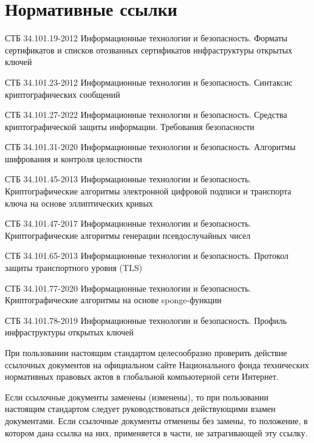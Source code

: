 \chapter{Нормативные ссылки}\label{Refs}


СТБ 34.101.19-2012 Информационные технологии и безопасность. Форматы
сертификатов и списков отозванных сертификатов инфраструктуры открытых ключей

СТБ 34.101.23-2012 Информационные технологии и безопасность. Синтаксис
криптографических сообщений

СТБ 34.101.27-2022 Информационные технологии и безопасность. Средства
криптографической защиты информации. Требования безопасности

СТБ 34.101.31-2020 Информационные технологии и безопасность. Алгоритмы 
шифрования и контроля целостности  

СТБ 34.101.45-2013 Информационные технологии и безопасность. Криптографические
алгоритмы электронной цифровой подписи и транспорта ключа на основе
эллиптических кривых

СТБ 34.101.47-2017 Информационные технологии и безопасность. Криптографические
алгоритмы генерации псевдослучайных чисел

СТБ 34.101.65-2013 Информационные технологии и безопасность. Протокол защиты
транспортного уровня (TLS)


СТБ 34.101.77-2020 Информационные технологии и безопасность. Криптографические
алгоритмы на основе sponge-функции

СТБ 34.101.78-2019 Информационные технологии и безопасность. Профиль
инфраструктуры открытых ключей


\begin{note*}
При пользовании настоящим стандартом целесообразно проверить действие
ссылочных документов на официальном сайте Национального фонда
технических нормативных правовых актов в глобальной компьютерной сети Интернет.

Если ссылочные документы заменены (изменены), то при пользовании настоящим
стандартом следует руководствоваться действующими взамен документами. Если
ссылочные документы отменены без замены, то положение, в котором дана ссылка на
них, применяется в части, не затрагивающей эту ссылку.
\end{note*}


